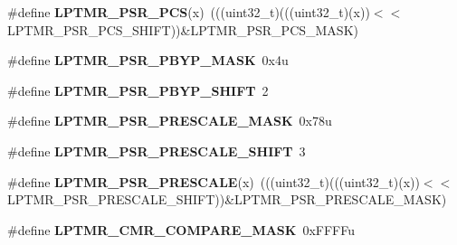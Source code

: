 \begin{DoxyCompactItemize}
\item 
\#define {\bfseries L\+P\+T\+M\+R\+\_\+\+P\+S\+R\+\_\+\+P\+CS}(x)~(((uint32\+\_\+t)(((uint32\+\_\+t)(x))$<$$<$L\+P\+T\+M\+R\+\_\+\+P\+S\+R\+\_\+\+P\+C\+S\+\_\+\+S\+H\+I\+FT))\&L\+P\+T\+M\+R\+\_\+\+P\+S\+R\+\_\+\+P\+C\+S\+\_\+\+M\+A\+SK)\hypertarget{group__LPTMR__Register__Masks_gabeba0b705770f53c56a569a5ee74536b}{}\label{group__LPTMR__Register__Masks_gabeba0b705770f53c56a569a5ee74536b}

\item 
\#define {\bfseries L\+P\+T\+M\+R\+\_\+\+P\+S\+R\+\_\+\+P\+B\+Y\+P\+\_\+\+M\+A\+SK}~0x4u\hypertarget{group__LPTMR__Register__Masks_gab3daae6085cf702b31db5be78fe03872}{}\label{group__LPTMR__Register__Masks_gab3daae6085cf702b31db5be78fe03872}

\item 
\#define {\bfseries L\+P\+T\+M\+R\+\_\+\+P\+S\+R\+\_\+\+P\+B\+Y\+P\+\_\+\+S\+H\+I\+FT}~2\hypertarget{group__LPTMR__Register__Masks_ga4bb5021e396db697f5e597fdcdc222e3}{}\label{group__LPTMR__Register__Masks_ga4bb5021e396db697f5e597fdcdc222e3}

\item 
\#define {\bfseries L\+P\+T\+M\+R\+\_\+\+P\+S\+R\+\_\+\+P\+R\+E\+S\+C\+A\+L\+E\+\_\+\+M\+A\+SK}~0x78u\hypertarget{group__LPTMR__Register__Masks_ga93a6fe3fb169a73716a837cedb92dbef}{}\label{group__LPTMR__Register__Masks_ga93a6fe3fb169a73716a837cedb92dbef}

\item 
\#define {\bfseries L\+P\+T\+M\+R\+\_\+\+P\+S\+R\+\_\+\+P\+R\+E\+S\+C\+A\+L\+E\+\_\+\+S\+H\+I\+FT}~3\hypertarget{group__LPTMR__Register__Masks_ga7ed76902e13634d0c543ade3ef47525a}{}\label{group__LPTMR__Register__Masks_ga7ed76902e13634d0c543ade3ef47525a}

\item 
\#define {\bfseries L\+P\+T\+M\+R\+\_\+\+P\+S\+R\+\_\+\+P\+R\+E\+S\+C\+A\+LE}(x)~(((uint32\+\_\+t)(((uint32\+\_\+t)(x))$<$$<$L\+P\+T\+M\+R\+\_\+\+P\+S\+R\+\_\+\+P\+R\+E\+S\+C\+A\+L\+E\+\_\+\+S\+H\+I\+FT))\&L\+P\+T\+M\+R\+\_\+\+P\+S\+R\+\_\+\+P\+R\+E\+S\+C\+A\+L\+E\+\_\+\+M\+A\+SK)\hypertarget{group__LPTMR__Register__Masks_ga37d8f4b0de3a75590548d8f3b6686b95}{}\label{group__LPTMR__Register__Masks_ga37d8f4b0de3a75590548d8f3b6686b95}

\item 
\#define {\bfseries L\+P\+T\+M\+R\+\_\+\+C\+M\+R\+\_\+\+C\+O\+M\+P\+A\+R\+E\+\_\+\+M\+A\+SK}~0x\+F\+F\+F\+Fu\hypertarget{group__LPTMR__Register__Masks_ga55cc95c022500b353f1724f2cbfe7a8f}{}\label{group__LPTMR__Register__Masks_ga55cc95c022500b353f1724f2cbfe7a8f}


\end{DoxyCompactItemize}
